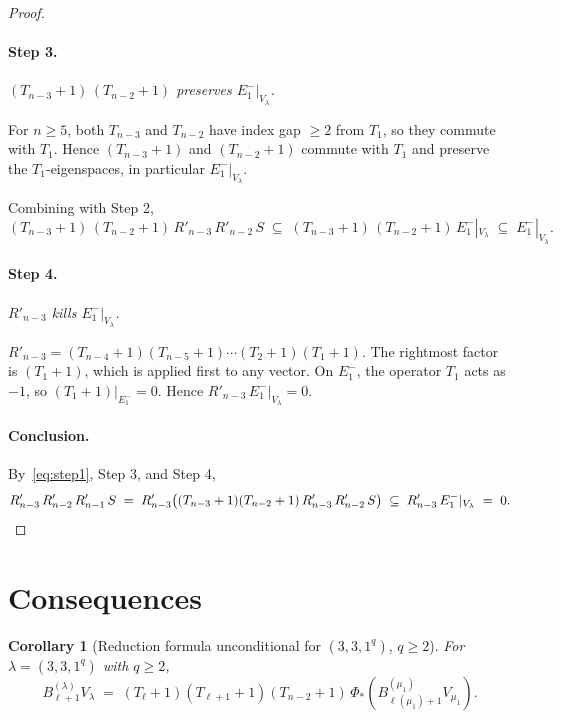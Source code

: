 \documentclass[11pt]{article}
\newtheorem{corollary}[theorem]{Corollary}
\theoremstyle{definition}
\begin{document}
\begin{proof}
\paragraph{Step 3.} \emph{$(T_{n-3}+1)\,(T_{n-2}+1)$ preserves
$E_1^-|_{V_\lambda}$.}

For $n \ge 5$, both $T_{n-3}$ and $T_{n-2}$ have index gap $\ge 2$
from $T_1$, so they commute with $T_1$. Hence $(T_{n-3}+1)$ and
$(T_{n-2}+1)$ commute with $T_1$ and preserve the $T_1$-eigenspaces,
in particular $E_1^-|_{V_\lambda}$.

Combining with Step 2,
\[
   (T_{n-3}+1)\,(T_{n-2}+1)\, R'_{n-3}\, R'_{n-2}\, S
   \;\subseteq\; (T_{n-3}+1)\,(T_{n-2}+1)\, E_1^-|_{V_\lambda}
   \;\subseteq\; E_1^-|_{V_\lambda}.
\]

\paragraph{Step 4.} \emph{$R'_{n-3}$ kills $E_1^-|_{V_\lambda}$.}

$R'_{n-3} = (T_{n-4}+1)(T_{n-5}+1)\cdots(T_2+1)(T_1+1)$. The
rightmost factor is $(T_1+1)$, which is applied first to any vector.
On $E_1^-$, the operator $T_1$ acts as $-1$, so $(T_1+1)|_{E_1^-} = 0$.
Hence $R'_{n-3}\, E_1^-|_{V_\lambda} = 0$.

\paragraph{Conclusion.} By~\eqref{eq:step1}, Step 3, and Step 4,
\[
   R'_{n-3}\, R'_{n-2}\, R'_{n-1}\, S
   \;=\; R'_{n-3}\big( (T_{n-3}+1)(T_{n-2}+1)\, R'_{n-3}\, R'_{n-2}\, S \big)
   \;\subseteq\; R'_{n-3}\, E_1^-|_{V_\lambda} \;=\; 0. \qedhere
\]
\end{proof}

\section{Consequences}\label{sec:cons}

\begin{corollary}[Reduction formula unconditional for $(3, 3, 1^q)$, $q \ge 2$]\label{cor:reduction}
For $\lambda = (3, 3, 1^q)$ with $q \ge 2$,
\begin{equation}\label{eq:reduction}
   B_{\ell+1}^{(\lambda)} V_\lambda
   \;=\;
   (T_\ell{+}1)(T_{\ell+1}{+}1)(T_{n-2}{+}1)\,
   \Phi_*\!\left(B_{\ell(\mu_1)+1}^{(\mu_1)} V_{\mu_1}\right).
\end{equation}
\end{corollary}
\end{document}
